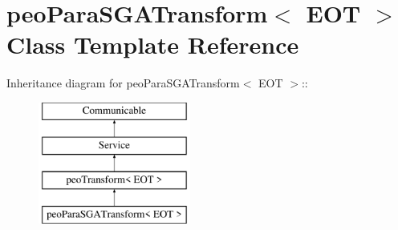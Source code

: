 \hypertarget{classpeoParaSGATransform}{
\section{peo\-Para\-SGATransform$<$ EOT $>$ Class Template Reference}
\label{classpeoParaSGATransform}
}
Inheritance diagram for peo\-Para\-SGATransform$<$ EOT $>$::\begin{figure}[H]
\begin{center}
\leavevmode
\includegraphics[height=4cm]{classpeoParaSGATransform}
\end{center}
\end{figure}
